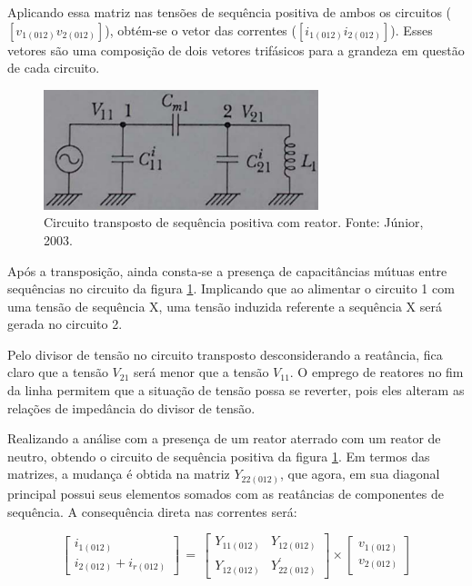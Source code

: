 Aplicando essa matriz nas tensões de sequência positiva de ambos os circuitos ($[v_{1(012)} v_{2(012)}]$), obtém-se o vetor das correntes ($[i_{1(012)} i_{2(012)}]$). Esses vetores são uma composição de dois vetores trifásicos para a grandeza em questão de cada circuito.

\begin{figure}[H]
\begin{center}
\includegraphics[width=8cm]{images/seq_pos_reator.png}
\caption{Circuito transposto de sequência positiva com reator. Fonte: Júnior, 2003.}
\label{slide3:seq_pos_reat} 
\end{center}
\end{figure}

Após a transposição, ainda consta-se a presença de capacitâncias mútuas entre sequências no circuito da figura \ref{slide3:seq_pos_reat}. Implicando que ao alimentar o circuito 1 com uma tensão de sequência X, uma tensão induzida referente a sequência X será gerada no circuito 2.

Pelo divisor de tensão no circuito transposto desconsiderando a reatância, fica claro que a tensão $V_{21}$ será menor que a tensão $V_{11}$. O emprego de reatores no fim da linha permitem que a situação de tensão possa se reverter, pois eles alteram as relações de impedância do divisor de tensão.

Realizando a análise com a presença de um reator aterrado com um reator de neutro, obtendo o circuito de sequência positiva da figura \ref{slide3:seq_pos_reat}. Em termos das matrizes, a mudança é obtida na matriz $Y_{22(012)}$, que agora, em sua diagonal principal possui seus elementos somados com as reatâncias de componentes de sequência. A consequência direta nas correntes será:

\begin{equation} \label{slide:3:3}
    \begin{bmatrix} i_{1(012)}  \\ i_{2(012)} + i_{r(012)}  \end{bmatrix} \, = \,\begin{bmatrix} Y_{11(012)} & Y_{12(012)} \\ Y_{12(012)} & Y_{22(012)}^{'}  \end{bmatrix} \times \begin{bmatrix} v_{1(012)}  \\ v_{2(012)}  \end{bmatrix}
\end{equation}

